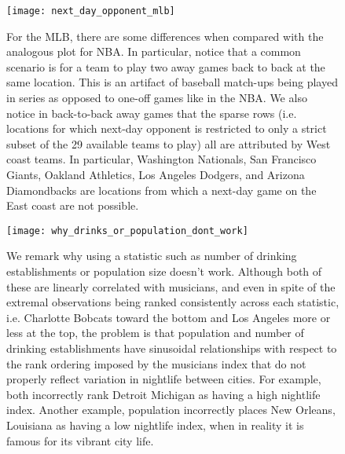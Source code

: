 \documentclass[letterpaper,12pt]{article}
\begin{document}
\begin{figure}   
  \centering
  \hspace{-55pt}
  \label{fig: next day opponent mlb}
  \texttt{[image: next\_day\_opponent\_mlb]} 
  \caption{For the MLB, there are some differences when compared with the analogous
  plot for NBA. In particular, notice that a common scenario is for a team to play two away games 
  back to back at the same location. This is an artifact of baseball match-ups being played 
  in series as opposed to one-off games like in the NBA. We also notice in back-to-back
  away games that the sparse rows 
  (i.e. locations for which next-day opponent is restricted to only a strict subset of the 
  29 available teams to play) all are attributed by West coast teams. In particular, 
  Washington Nationals, San Francisco Giants, Oakland Athletics, Los Angeles Dodgers, and 
  Arizona Diamondbacks are locations from which a next-day game on the East coast are not possible.}
\end{figure}

\begin{sidewaysfigure}   
  \centering
  \label{fig: why drinks or pop dont work}
  \texttt{[image: why\_drinks\_or\_population\_dont\_work]} 
  \caption{We remark why using a statistic such as number of drinking establishments or 
    population size doesn't work. Although both of these are linearly correlated with musicians, 
    and even in spite of the extremal observations being ranked consistently across each statistic, 
    i.e. Charlotte Bobcats toward the bottom and Los Angeles more or less at the top,  
    the problem is that population and number of drinking establishments have sinusoidal 
    relationships with respect to the rank ordering imposed by the musicians index 
    that do not properly reflect variation in nightlife between cities. For example, both 
    incorrectly rank Detroit Michigan as having a high nightlife index. Another example, 
    population incorrectly places New Orleans, Louisiana as having a low nightlife index, 
    when in reality it is famous for its vibrant city life.}
\end{sidewaysfigure}
\end{document}
